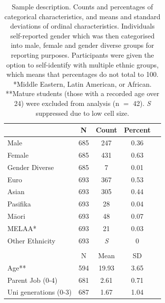 \begin{table}[ht]
\centering

\begin{tabular}{lcccc}
\hline
& N   & Count & Percent    \\ \hline
Male                                                         & 685 & 247 & 0.36   \\
Female                                                       & 685 & 431 & 0.63   \\
Gender Diverse                                               & 685 & 7 & 0.01   \\
Euro                                                         & 693 & 367 & 0.53   \\
Asian                                                        & 693 & 305 & 0.44   \\
Pasifika                                                      & 693 & 28 & 0.04    \\
M\={a}ori                                                        & 693 & 48 & 0.07 \\
MELAA*                                                        & 693 & 21 & 0.03  \\
Other Ethnicity                                               & 693 & \textit{S} & 0   \\
& & &  \\ \hline
& N & Mean & SD \\\hline 
Age** & 594 & 19.93 & 3.65 \\
Parent Job  (0-4) &  681 & 2.61 & 0.71 \\
Uni generations (0-3)                                        & 687 & 1.67 & 1.04 \\ \hline
\end{tabular}
\caption{Sample description. Counts and percentages of categorical characteristics, and means and standard deviations of ordinal characteristics. Individuals self-reported gender which was then categorised into male, female and gender diverse groups for reporting purposes. Participants were given the option to  self-identify with multiple ethnic groups, which means that percentages do not total to 100.  *Middle Eastern, Latin American, or African. **Mature students (those with a recorded age over 24) were excluded from analysis (n $=$ 42). \textit{S} suppressed due to low cell size.} 
\label{tab:Sample}       %
\end{table}

